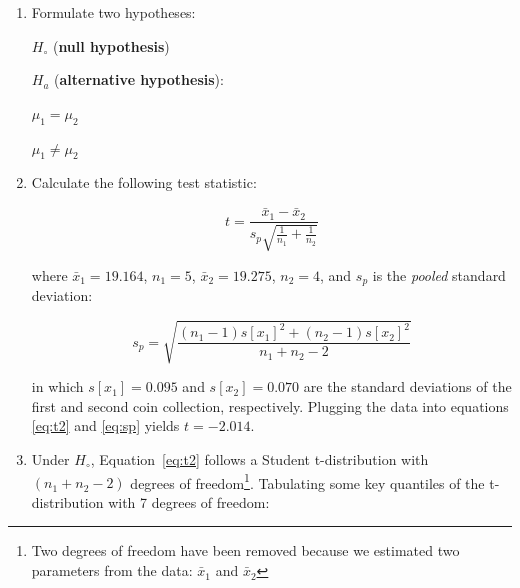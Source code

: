 \begin{enumerate}
\item  Formulate two hypotheses:\\

  \noindent\begin{minipage}{.4\textwidth}
    $H_\circ$ (\textbf{null hypothesis})
    
    \vspace{1em}
    
    $H_a$ (\textbf{alternative hypothesis}):
  \end{minipage}
  \begin{minipage}{.2\textwidth}
  \end{minipage}
  \begin{minipage}{.2\textwidth}
    $\mu_1=\mu_2$
    
    \vspace{1em}
    
    $\mu_1\neq{\mu_2}$
  \end{minipage}
  \begin{minipage}{.2\textwidth}
  \end{minipage}
  
\item Calculate the following test statistic:

  \begin{equation}
    t = \frac{\bar{x}_1 - \bar{x}_2}{s_p\sqrt{\frac{1}{n_1}+\frac{1}{n_2}}}
    \label{eq:t2}
  \end{equation}

  \noindent where $\bar{x}_1 = 19.164$, $n_1 = 5$, $\bar{x}_2 =
  19.275$, $n_2 = 4$, and $s_p$ is the \emph{pooled} standard
  deviation:

  \begin{equation}
    s_p = \sqrt{\frac{(n_1-1) s[x_1]^2 + (n_2-1) s[x_2]^2}{n_1 + n_2 - 2}}
    \label{eq:sp}
  \end{equation}

  \noindent in which $s[x_1]=0.095$ and $s[x_2]=0.070$ are the
  standard deviations of the first and second coin collection,
  respectively. Plugging the data into equations \ref{eq:t2} and
  \ref{eq:sp} yields $t=-2.014$.

\item Under $H_\circ$, Equation~\ref{eq:t2} follows a Student
  t-distribution with $(n_1+n_2-2)$ degrees of freedom\footnote{Two
    degrees of freedom have been removed because we estimated two
    parameters from the data: $\bar{x}_1$ and $\bar{x}_2$}. Tabulating
  some key quantiles of the t-distribution with 7 degrees of freedom:


\end{enumerate}
